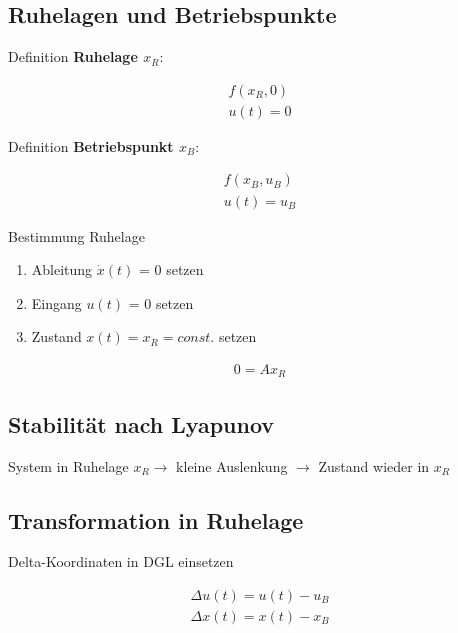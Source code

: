 \documentclass[10pt,a4paper]{article}
\begin{document}
  \subsection{Ruhelagen und Betriebspunkte}
  Definition \textbf{Ruhelage $x_R$}:
  \begin{mdframed}[style=exercise]
    \begin{align}
        f(x_R, 0) \\ u(t) = 0
    \end{align}
  \end{mdframed}
  Definition \textbf{Betriebspunkt $x_B$}:
  \begin{mdframed}[style=exercise]
    \begin{align}
        f(x_B, u_B) \\ u(t) = u_B
    \end{align}
  \end{mdframed}
  Bestimmung Ruhelage
  \begin{enumerate}
    \item Ableitung $\dot{x}(t)$ = 0 setzen 
    \item Eingang $u(t)$ = 0 setzen 
    \item Zustand $x(t) = x_R = const.$ setzen 
  \end{enumerate}
  \begin{mdframed}[style=exercise]
    \begin{align}
        0 = A x_R 
    \end{align}
  \end{mdframed}

  \newpage
  \subsection{Stabilität nach Lyapunov}
 System in Ruhelage $x_R \rightarrow$ kleine Auslenkung $\rightarrow$ Zustand wieder in $x_R$
  \subsection{Transformation in Ruhelage}
  Delta-Koordinaten in DGL einsetzen
  \begin{mdframed}[style=exercise]
    \begin{align}
        \Delta u(t) = u(t) - u_B \\
        \Delta x(t) = x(t) - x_B
    \end{align}
  \end{mdframed}
\end{document}
